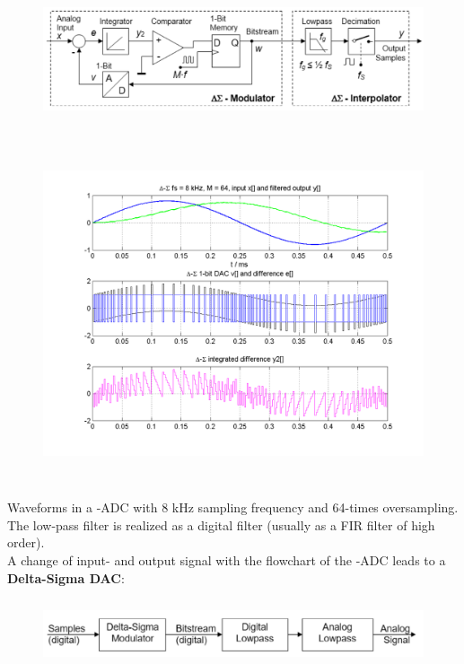     \begin{figure}[h]
    \centering
    \includegraphics[width=15cm, height=4cm]{Images/image179.png}
    \caption{}
    \label{fig:Fig }
    \end{figure}
    
    \begin{figure}[h]
    \centering
    \includegraphics[width=15cm, height=10cm]{Images/image43.png}
    \label{fig:Fig }
    \end{figure}

Waveforms in a -ADC with 8 kHz sampling frequency and 64-times oversampling. The low-pass filter is realized as a digital filter (usually as a FIR filter of high order). \\

A change of input- and output signal with the flowchart of the -ADC leads to a \\

{\rot\bf Delta-Sigma DAC}:\\

    \begin{figure}[h]
    \centering
    \includegraphics[width=14cm, height=2cm]{Images/image180.png}
    \label{fig:Fig }
    \end{figure}

